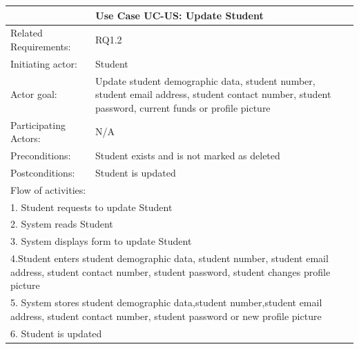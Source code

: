 \documentclass[12pt]{article}
\begin{document}
		\begin{tabular}{| l | p{10cm}| }
			\hline\multicolumn{2}{|c|}{ \textbf{Use Case UC-US: Update Student}} \\ \hline
			Related Requirements: & RQ1.2\\ \hline
			Initiating actor: & Student \\ \hline
			Actor goal: & Update student demographic data, student number, student email address, student contact number, student password, current funds or profile picture\\ \hline
			Participating Actors: & N/A\\ \hline
			Preconditions: & Student exists and is not marked as deleted\\ \hline
			Postconditions: & Student is updated\\ \hline
			\multicolumn{2}{|l|}{Flow of activities:}\\ \hline
			\multicolumn{2}{|p{15cm}|}{1. Student requests to update Student}\\
			\multicolumn{2}{|p{15cm}|}{2. System reads Student}\\
			\multicolumn{2}{|p{15cm}|}{3. System displays form to update Student}\\
			\multicolumn{2}{|p{15cm}|}{4.Student enters student demographic data, student number, student email address, student contact number, student password, student changes profile picture}	\\
			\multicolumn{2}{|p{15cm}|}{5. System stores student demographic data,student number,student email address, student contact number, student password or new profile picture}\\
			\multicolumn{2}{|l|}{6. Student is updated}
			\\ \hline
		\end{tabular}
\end{document}
